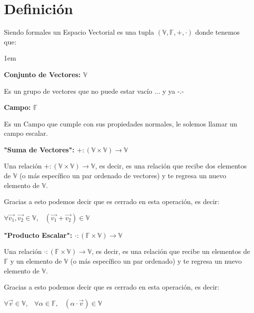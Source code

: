 \documentclass[12pt]{report}                                    %
\newenvironment{Indentation}[1][0.75em]                         %
    {\begin{adjustwidth}{#1}{}}                                     %
    {\end{adjustwidth}}                                             %
\DeclareMathOperator \Space {\quad}                             %
\DeclareMathOperator \MiniSpace {\;}                            %
\begin{document}
        \section{Definición}

            Siendo formales un Espacio Vectorial es una tupla $(\mathbb{V}, \mathbb{F}, +, \cdot)$ donde tenemos que:
            \begin{Indentation}[1em]
            \begin{itemize}
            \small{
                
                \item
                    \textbf{Conjunto de Vectores: $\mathbb{V}$}

                    Es un grupo de vectores que no puede estar vacío ... y ya -.- 

                \item
                    \textbf{Campo: $\mathbb{F}$}

                    Es un Campo que cumple con sus propiedades normales, le solemos llamar un campo escalar.

                \item
                    \textbf{"Suma de Vectores": $+: (\mathbb{V} \times  \mathbb{V}) \to \mathbb{V}$}

                    Una relación $+: (\mathbb{V} \times  \mathbb{V}) \to \mathbb{V}$, es decir, es una relación
                    que recibe dos elementos de $\mathbb{V}$ (o más específico un par ordenado de vectores) y te
                    regresa un nuevo elemento de $\mathbb{V}$.

                    Gracias a esto podemos decir que es cerrado en esta operación, es decir:

                    $\forall \vec{v_1}, \vec{v_2} \in \mathbb{V},
                        \MiniSpace (\vec{v_1} + \vec{v_2}) \in \mathbb{V}$                            

                \item
                    \textbf{"Producto Escalar": $\cdot: (\mathbb{F} \times  \mathbb{V}) \to \mathbb{V}$}

                    Una relación $\cdot: (\mathbb{F} \times  \mathbb{V}) \to \mathbb{V}$, es decir, es una relación
                    que recibe un elementos de $\mathbb{F}$ y un elemento de $\mathbb{V}$
                    (o más específico un par ordenado) y te regresa un nuevo elemento de $\mathbb{V}$.

                    Gracias a esto podemos decir que es cerrado en esta operación, es decir:

                    $\forall \vec{v} \in \mathbb{V}, \MiniSpace
                        \forall \alpha \in \mathbb{F}, \MiniSpace
                            (\alpha \cdot \vec{v}) \in \mathbb{V}$  
            }
            \end{itemize}
            \end{Indentation}
\end{document}
